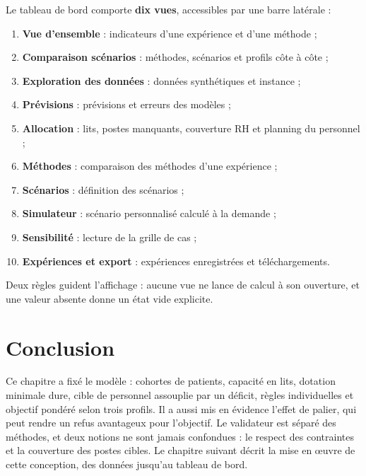 Le tableau de bord comporte \textbf{dix vues}, accessibles par une barre latérale :
\begin{enumerate}
    \item \textbf{Vue d'ensemble} : indicateurs d'une expérience et d'une méthode ;
    \item \textbf{Comparaison scénarios} : méthodes, scénarios et profils côte à côte ;
    \item \textbf{Exploration des données} : données synthétiques et instance ;
    \item \textbf{Prévisions} : prévisions et erreurs des modèles ;
    \item \textbf{Allocation} : lits, postes manquants, couverture RH et planning du personnel ;
    \item \textbf{Méthodes} : comparaison des méthodes d'une expérience ;
    \item \textbf{Scénarios} : définition des scénarios ;
    \item \textbf{Simulateur} : scénario personnalisé calculé à la demande ;
    \item \textbf{Sensibilité} : lecture de la grille de \NbCas{} cas ;
    \item \textbf{Expériences et export} : expériences enregistrées et téléchargements.
\end{enumerate}

Deux règles guident l'affichage : aucune vue ne lance de calcul à son ouverture, et une valeur absente donne un état vide explicite.

\section*{Conclusion}
Ce chapitre a fixé le modèle : cohortes de patients, capacité en lits, dotation minimale dure, cible de personnel assouplie par un déficit, règles individuelles et objectif pondéré selon trois profils. Il a aussi mis en évidence l'effet de palier, qui peut rendre un refus avantageux pour l'objectif. Le validateur est séparé des méthodes, et deux notions ne sont jamais confondues : le respect des contraintes et la couverture des postes cibles. Le chapitre suivant décrit la mise en œuvre de cette conception, des données jusqu'au tableau de bord.
